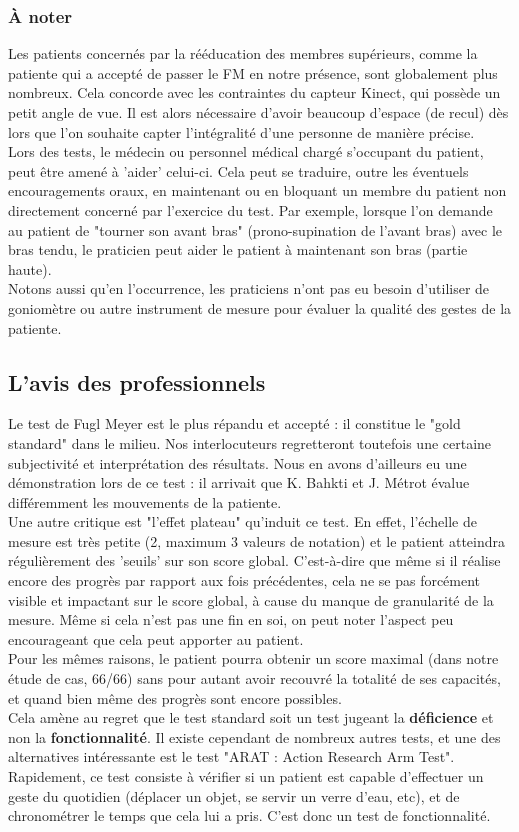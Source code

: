 \documentclass[french,12pt]{report}
\begin{document}
				\subsubsection{À noter}
Les patients concernés par la rééducation des membres supérieurs, comme la patiente qui a accepté de passer 
le FM en notre présence, sont globalement plus nombreux. Cela concorde avec les contraintes du capteur Kinect, 
qui possède un petit angle de vue. Il est alors nécessaire d'avoir beaucoup d'espace (de recul) dès lors que 
l'on souhaite capter l'intégralité d'une personne de manière précise. \\
Lors des tests, le médecin ou personnel médical chargé s'occupant du patient, peut être amené à 'aider' celui-ci.
Cela peut se traduire, outre les éventuels encouragements oraux, en maintenant ou en bloquant un membre du patient
non directement concerné par l'exercice du test. Par exemple, lorsque l'on demande au patient de "tourner son avant 
bras" (prono-supination de l'avant bras) avec le bras tendu, le praticien peut aider le patient à maintenant son bras
(partie haute).\\
Notons aussi qu'en l'occurrence, les praticiens n'ont pas eu besoin d'utiliser de goniomètre ou autre instrument de 
mesure pour évaluer la qualité des gestes de la patiente.
		
	\subsection{L'avis des professionnels}
	Le test de Fugl Meyer est le plus répandu et accepté : il constitue le "gold standard" dans le milieu.
	Nos interlocuteurs regretteront toutefois une certaine subjectivité et interprétation des résultats.
	Nous en avons d'ailleurs eu une démonstration lors de ce test : il arrivait que K. Bahkti et J. Métrot 
	évalue différemment les mouvements de la patiente. \\
Une autre critique est "l'effet plateau" qu'induit ce test. En effet, l'échelle de mesure est très petite 
(2, maximum 3 valeurs de notation) et le patient atteindra régulièrement des 'seuils' sur son score global. 
C'est-à-dire que même si il réalise encore des progrès par rapport aux fois précédentes, cela ne se pas forcément 
visible et impactant sur le score global, à cause du manque de granularité de la mesure. Même si cela n'est pas une 
fin en soi, on peut noter l'aspect peu encourageant que cela peut apporter au patient. \\
Pour les mêmes raisons, le patient pourra obtenir un score maximal (dans notre étude de cas, 66/66) sans pour autant
avoir recouvré la totalité de ses capacités, et quand bien même des progrès sont encore possibles. \\
Cela amène au regret que le test standard soit un test jugeant la \textbf{déficience} et non la \textbf{fonctionnalité}. 
Il existe cependant de nombreux autres tests, et une des alternatives intéressante est le test "ARAT : 
Action Research Arm Test". %
Rapidement, ce test consiste à vérifier si un patient est capable d'effectuer un geste du quotidien (déplacer
un objet, se servir un verre d'eau, etc), et de chronométrer le temps que cela lui a pris. C'est donc un test 
de fonctionnalité.
	
\end{document}
